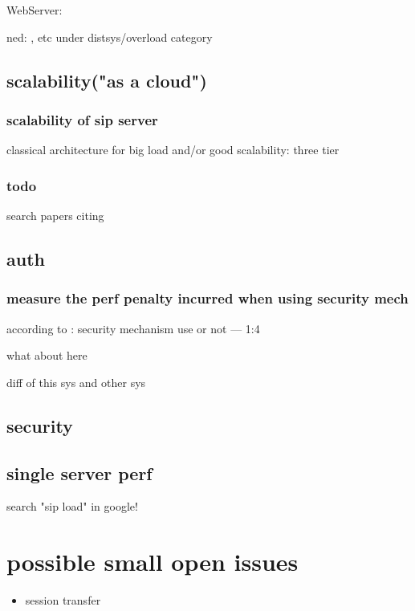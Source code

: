 \documentclass[•]{article}
\begin{document}
WebServer: \cite{Iyer}

ned: \cite{Hong2010}, etc under distsys/overload category


\subsection{scalability("as a cloud")}
\subsubsection{scalability of sip server}
classical architecture for big load and/or good scalability: three tier \cite{Kim2011}

\subsubsection{todo}
search papers citing \cite{Vaquero2011}

\subsection{auth}

\subsubsection{measure the perf penalty incurred when using security mech}

according to \cite{Nahum2007}:
security mechanism use or not — 1:4

what about here

diff of this sys and other sys

\subsection{security}

\subsection{single server perf}

search "sip load" in google!




\section{possible small open issues}
\begin{itemize}
\item session transfer
\end{itemize}
\end{document}
